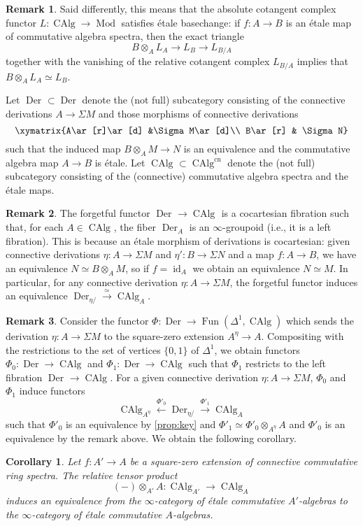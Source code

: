 \documentclass{article}
\newtheorem{corollary}{Corollary}[subsection]
\theoremstyle{definition}
\newtheorem{remark}{Remark}[subsection]
\renewcommand{\i}{\infty}
\newcommand{\too}{\longrightarrow}
\newcommand{\from}{\longleftarrow}
\DeclareMathOperator{\et}{\acute{e}t}
\DeclareMathOperator{\Mod}{Mod}
\DeclareMathOperator{\CAlg}{CAlg}
\DeclareMathOperator{\Der}{Der}
\DeclareMathOperator{\Fun}{Fun}
\DeclareMathOperator{\id}{id}
\newcommand{\cn}{\mathrm{cn}}
\begin{document}
\begin{remark}
Said differently, this means that the absolute cotangent complex functor $L:\CAlg\to\Mod$ satisfies \'etale basechange:
if $f:A\to B$ is an \'etale map of commutative algebra spectra, then the exact triangle
\[
B\otimes_A L_A\too L_B\too L_{B/A}
\]
together with the vanishing of the relative cotangent complex $L_{B/A}$ implies that $B\otimes_A L_A\simeq L_B$.
\end{remark}


Let $\Der^{\et}\subset\Der$ denote the (not full) subcategory consisting of the connective derivations $A\to\Sigma M$ and those morphisms of connective derivations
\[
\xymatrix{A\ar[r]\ar[d] &\Sigma M\ar[d]\\
B\ar[r] & \Sigma N}
\]
such that the induced map $B\otimes_A M\to N$ is an equivalence and the commutative algebra map $A\to B$ is \'etale.
Let $\CAlg^{\et}\subset\CAlg^{\cn}$ denote the (not full) subcategory consisting of the (connective) commutative algebra spectra and the \'etale maps.
\begin{remark}
The forgetful functor $\Der^{\et}\to\CAlg^{\et}$ is a cocartesian fibration such that, for each $A\in\CAlg^{\et}$, the fiber $\Der^{\et}_A$ is an $\i$-groupoid (i.e., it is a left fibration).
This is because an \'etale morphism of derivations is cocartesian: given connective derivations $\eta:A\to\Sigma M$ and $\eta':B\to\Sigma N$ and a map $f:A\to B$, we have an equivalence $N\simeq B\otimes_A M$, so if $f=\id_A$ we obtain an equivalence $N\simeq M$.
In particular, for any connective derivation $\eta:A\to\Sigma M$, the forgetful functor induces an equivalence
$
\Der^{\et}_{\eta/}\overset{\simeq}{\too}\CAlg_{A}^{\et}.
$
\end{remark}

\begin{remark}
Consider the functor $\Phi:\Der\to\Fun(\Delta^1,\CAlg)$ which sends the derivation $\eta:A\to\Sigma M$ to the square-zero extension $A^\eta\to A$.
Compositing with the restrictions to the set of vertices $\{0,1\}$ of $\Delta^1$, we obtain functors $\Phi_0:\Der\to\CAlg$ and $\Phi_1:\Der\to\CAlg$ such that $\Phi_1$ restricts to the left fibration $\Der^{\et}\to\CAlg^{\et}$.
For a given connective derivation $\eta:A\to\Sigma M$, $\Phi_0$ and $\Phi_1$ induce functors
\[
\CAlg^{\et}_{A^\eta}\overset{\Phi'_0}{\from}\Der^{\et}_{\eta/}\overset{\Phi'_1}{\too}\CAlg^{\et}_A
\]
such that $\Phi'_0$ is an equivalence by \autoref{prop:key} and $\Phi'_1\simeq\Phi'_0\otimes_{A^\eta} A$ and $\Phi'_0$ is an equivalence by the remark above.
We obtain the following corollary.
\end{remark}
\begin{corollary} Let $f:A'\to A$ be a square-zero extension of connective commutative ring spectra. The relative
tensor product
\[
(-)\otimes_{A'} A:\CAlg_{A'}\too\CAlg_A
\]
induces an equivalence from the $\infty$-category of \'etale commutative $A'$-algebras to the $\infty$-category of \'etale commutative $A$-algebras.
\end{corollary}
\end{document}
